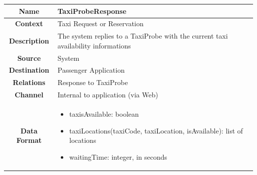 \documentclass[11pt, a4paper,titlepage]{article}
\begin{document}
		\begin{tabularx}{\textwidth}{| c | X |}
			\hline
			\textbf{Name} & 
			TaxiProbeResponse
			\\
			\hline
			\textbf{Context} & 
			Taxi Request or Reservation
			\\
			\hline
			\textbf{Description} & 
			The system replies to a TaxiProbe with the current taxi availability informations
			\\
			\hline
			\textbf{Source} &
			System
			\\
			\hline
			\textbf{Destination} & 
			Passenger Application
			\\
			\hline
			\textbf{Relations} & 
			Response to TaxiProbe
			\\
			\hline
			\textbf{Channel} & 
			Internal to application (via Web)
			\\
			\hline
			\textbf{Data Format} & 
			\begin{itemize}
				\item taxisAvailable: boolean
				\item taxiLocations(taxiCode, taxiLocation, isAvailable): list of locations
				\item waitingTime: integer, in seconds
			\end{itemize}
			\\
			\hline		
		\end{tabularx}
	
\end{document}
